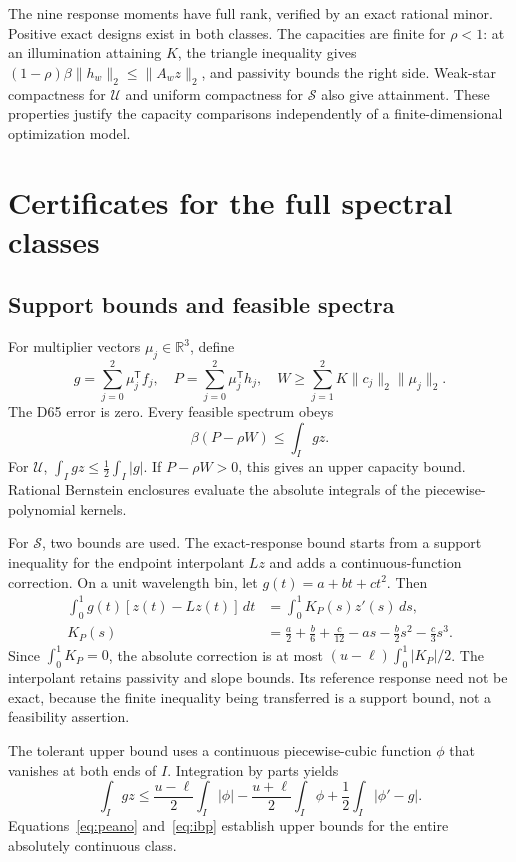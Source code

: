 \documentclass{optica-article}
\begin{document}
The nine response moments have full rank, verified by an exact rational minor. Positive exact designs exist in both classes. The capacities are finite for $\rho<1$: at an illumination attaining $K$, the triangle inequality gives $(1-\rho)\beta\|h_w\|_2\leq\|A_wz\|_2$, and passivity bounds the right side. Weak-star compactness for $\mathcal U$ and uniform compactness for $\mathcal S$ also give attainment. These properties justify the capacity comparisons independently of a finite-dimensional optimization model.

\section{Certificates for the full spectral classes}
\subsection{Support bounds and feasible spectra}
For multiplier vectors $\mu_j\in\mathbb R^3$, define
\begin{equation}
 g=\sum_{j=0}^2\mu_j^{\mathsf T}f_j,\quad
 P=\sum_{j=0}^2\mu_j^{\mathsf T}h_j,\quad
 W\geq\sum_{j=1}^2K\|c_j\|_2\|\mu_j\|_2.
 \label{eq:dual}
\end{equation}
The D65 error is zero. Every feasible spectrum obeys
\begin{equation}
 \beta(P-\rho W)\leq\int_Igz.
 \label{eq:support}
\end{equation}
For $\mathcal U$, $\int_Igz\leq\tfrac12\int_I|g|$. If $P-\rho W>0$, this gives an upper capacity bound. Rational Bernstein enclosures evaluate the absolute integrals of the piecewise-polynomial kernels.

For $\mathcal S$, two bounds are used. The exact-response bound starts from a support inequality for the endpoint interpolant $Lz$ and adds a continuous-function correction. On a unit wavelength bin, let $g(t)=a+bt+ct^2$. Then
\begin{align}
 \int_0^1g(t)[z(t)-Lz(t)]\,dt&=\int_0^1K_P(s)z'(s)\,ds,\\
 K_P(s)&=\frac a2+\frac b6+\frac c{12}-as-\frac b2s^2-\frac c3s^3.
 \label{eq:peano}
\end{align}
Since $\int_0^1K_P=0$, the absolute correction is at most $(u-\ell)\int_0^1|K_P|/2$. The interpolant retains passivity and slope bounds. Its reference response need not be exact, because the finite inequality being transferred is a support bound, not a feasibility assertion.

The tolerant upper bound uses a continuous piecewise-cubic function $\phi$ that vanishes at both ends of $I$. Integration by parts yields
\begin{equation}
 \int_Igz\leq\frac{u-\ell}{2}\int_I|\phi|
 -\frac{u+\ell}{2}\int_I\phi+\frac12\int_I|\phi'-g|.
 \label{eq:ibp}
\end{equation}
Equations~\eqref{eq:peano} and~\eqref{eq:ibp} establish upper bounds for the entire absolutely continuous class.
\end{document}
